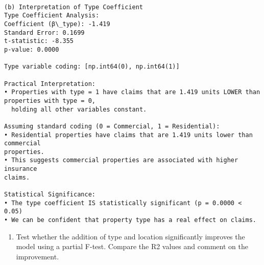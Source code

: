 \documentclass[8pt, twocolumn]{extarticle}
\providecommand{\tightlist}{%
      \setlength{\itemsep}{0pt}\setlength{\parskip}{0pt}}
\begin{document}
    \begin{Verbatim}[commandchars=\\\{\}]

(b) Interpretation of Type Coefficient
Type Coefficient Analysis:
Coefficient (β\_type): -1.419
Standard Error: 0.1699
t-statistic: -8.355
p-value: 0.0000

Type variable coding: [np.int64(0), np.int64(1)]

Practical Interpretation:
• Properties with type = 1 have claims that are 1.419 units LOWER than
properties with type = 0,
  holding all other variables constant.

Assuming standard coding (0 = Commercial, 1 = Residential):
• Residential properties have claims that are 1.419 units lower than commercial
properties.
• This suggests commercial properties are associated with higher insurance
claims.

Statistical Significance:
• The type coefficient IS statistically significant (p = 0.0000 < 0.05)
• We can be confident that property type has a real effect on claims.
    \end{Verbatim}

    \begin{enumerate}
\def\labelenumi{(\alph{enumi})}
\setcounter{enumi}{2}
\tightlist
\item
  Test whether the addition of type and location significantly improves
  the model using a partial F-test. Compare the R2 values and comment on
  the improvement.
\end{enumerate}
\end{document}
